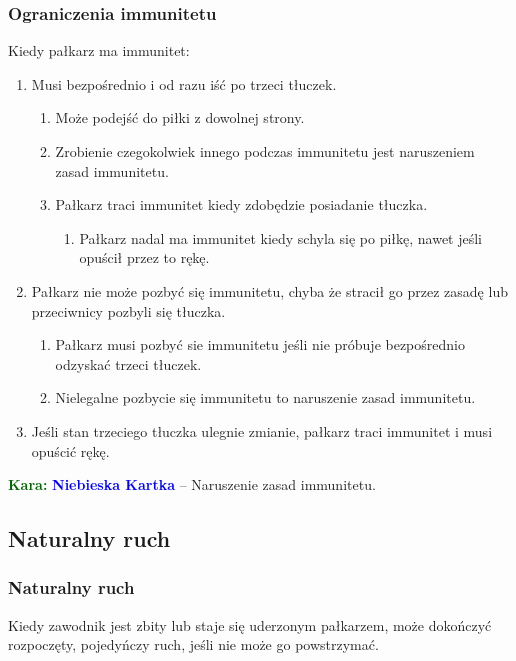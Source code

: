 \documentclass[11pt,a4paper]{article}
\newcommand\bluecard[1]{\bgroup\textcolor{darkgreen}{\textbf{Kara: }}\bgroup\textcolor{blue}{\textbf{Niebieska Kartka}} -- #1}
\begin{document}
\subsubsection{Ograniczenia immunitetu}
Kiedy pałkarz ma immunitet:
\begin{enumerate}
  \item Musi bezpośrednio i od razu iść po trzeci tłuczek.
  \begin{enumerate}
    \item Może podejść do piłki z dowolnej strony.
    \item Zrobienie czegokolwiek innego podczas immunitetu jest naruszeniem zasad immunitetu.
    \item Pałkarz traci immunitet kiedy zdobędzie posiadanie tłuczka.
    \begin{enumerate}
      \item Pałkarz nadal ma immunitet kiedy schyla się po piłkę, nawet jeśli opuścił przez to rękę.
    \end{enumerate}
  \end{enumerate}
  \item Pałkarz nie może pozbyć się immunitetu, chyba że stracił go przez zasadę lub przeciwnicy pozbyli się tłuczka.
  \begin{enumerate}
    \item Pałkarz musi pozbyć sie immunitetu jeśli nie próbuje bezpośrednio odzyskać trzeci tłuczek.
    \item Nielegalne pozbycie się immunitetu to naruszenie zasad immunitetu.
  \end{enumerate}
  \item Jeśli stan trzeciego tłuczka ulegnie zmianie, pałkarz traci immunitet i musi opuścić rękę.
\end{enumerate}

\bluecard{Naruszenie zasad immunitetu.}

\subsection{Naturalny ruch}

\subsubsection{Naturalny ruch}
Kiedy zawodnik jest zbity lub staje się uderzonym pałkarzem, może dokończyć rozpoczęty, pojedyńczy ruch, jeśli nie może go powstrzymać.
\end{document}
